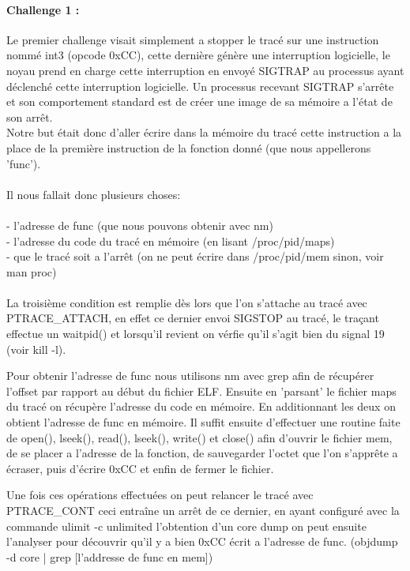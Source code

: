 \documentclass[12pt]{article}
\begin{document}
\paragraph{Challenge 1 :}

Le premier challenge visait simplement a stopper le tracé sur une instruction nommé int3 (opcode 0xCC), cette dernière génère une interruption logicielle,
le noyau prend en charge cette interruption en envoyé SIGTRAP au processus ayant déclenché cette interruption logicielle. 
Un processus recevant SIGTRAP s'arrête et son comportement standard est de créer une image de sa mémoire a l'état de son arrêt.\\

Notre but était donc d'aller écrire dans la mémoire du tracé cette instruction a la place de la première instruction de la fonction donné (que nous appellerons 'func').\\\\
Il nous fallait donc plusieurs choses:\\
\\
- l'adresse de func (que nous pouvons obtenir avec nm)\\
- l'adresse du code du tracé en mémoire (en lisant /proc/pid/maps)\\
- que le tracé soit a l'arrêt (on ne peut écrire dans /proc/pid/mem sinon, voir man proc)\\
\\
La troisième condition est remplie dès lors que l'on s'attache au tracé avec PTRACE\_ATTACH, en effet ce dernier envoi SIGSTOP au tracé,
le traçant effectue un waitpid() et lorsqu'il revient on vérfie qu'il s'agit bien du signal 19 (voir kill -l).

Pour obtenir l'adresse de func nous utilisons nm avec grep afin de récupérer l'offset par rapport au début du fichier ELF.
Ensuite en 'parsant' le fichier maps du tracé on récupère l'adresse du code en mémoire.
En additionnant les deux on obtient l'adresse de func en mémoire.
Il suffit ensuite d'effectuer une routine faite de open(), lseek(), read(), lseek(), write() et close() afin d'ouvrir le fichier mem,
de se placer a l'adresse de la fonction, de sauvegarder l'octet que l'on s'apprête a écraser, puis d'écrire 0xCC et enfin de fermer le fichier.

Une fois ces opérations effectuées on peut relancer le tracé avec PTRACE\_CONT ceci entraîne un arrêt de ce dernier,
en ayant configuré avec la commande ulimit -c unlimited l'obtention d'un core dump on peut ensuite l'analyser pour 
découvrir qu'il y a bien 0xCC écrit a l'adresse de func. (objdump -d core | grep [l'addresse de func en mem])
\end{document}
